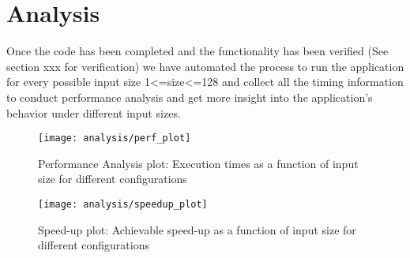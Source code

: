\section{Analysis}

Once the code has been completed and the functionality has been verified (See section xxx for verification) we have automated the process to run the application for every possible input size 1<=size<=128 and collect all the timing information to conduct performance analysis and get more insight into the application's behavior under different input sizes.



\begin{figure}[h!]
\texttt{[image: analysis/perf\_plot]}
\caption{Performance Analysis plot: Execution times as a function of input size for different configurations}
\label{fig:perf_plot}
\end{figure}


\begin{figure}[h!]
\texttt{[image: analysis/speedup\_plot]}
\caption{Speed-up plot: Achievable speed-up as a function of input size for different configurations}
\label{fig:speedup_plot}
\end{figure}


